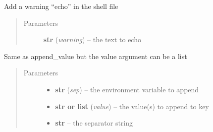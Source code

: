 \documentclass[a4paper,10pt,english]{sphinxmanual}
\begin{document}
\begin{fulllineitems}
\begin{fulllineitems}
\begin{quote}
\begin{description}
\end{description}\end{quote}

\end{fulllineitems}


\begin{fulllineitems}
\label{commands/apidoc/src:src.fileEnviron.FileEnviron.add_warning}
Add a warning ``echo'' in the shell file
\begin{quote}\begin{description}
\item[{Parameters}] \leavevmode
\textbf{str} (\emph{warning}) -- the text to echo

\end{description}\end{quote}

\end{fulllineitems}


\begin{fulllineitems}
\label{commands/apidoc/src:src.fileEnviron.FileEnviron.append}
Same as append\_value but the value argument can be a list
\begin{quote}\begin{description}
\item[{Parameters}] \leavevmode\begin{itemize}
\item {} 
\textbf{str} (\emph{sep}) -- the environment variable to append

\item {} 
\textbf{str or list} (\emph{value}) -- the value(s) to append to key

\item {} 
\textbf{str} -- the separator string

\end{itemize}

\end{description}\end{quote}

\end{fulllineitems}



\end{fulllineitems}
\end{document}
